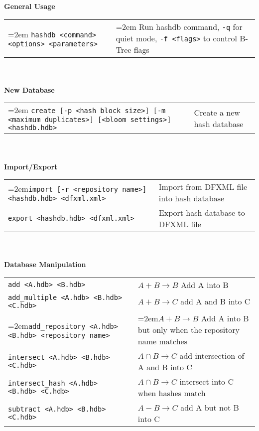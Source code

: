 \begin{small}
\begin{footnotesize}
\textbf{General Usage} \\
\begin{tabular}{p{3.6 in} p{3.0 in}}
\hangindent=2em \texttt{hashdb <command> <options> <parameters>} & \hangindent=2em Run hashdb command, \texttt{-q} for quiet mode, \texttt{-f <flags>} to control B-Tree flags \\
\end{tabular}
\\
\\
\textbf{New Database} \\
\begin{tabular}{p{3.6 in} p{3.0 in}}
\hangindent=2em \texttt{create [-p <hash block size>] [-m <maximum duplicates>] [<bloom settings>] <hashdb.hdb>} &
Create a new hash database \\
\end{tabular}
\\
\\
\textbf{Import/Export} \\
\begin{tabular}{p{3.6 in} p{3.0 in}}
\hangindent=2em\texttt{import [-r <repository name>] <hashdb.hdb> <dfxml.xml>} &
Import from DFXML file into hash database \\
\texttt{export <hashdb.hdb> <dfxml.xml>} &
Export hash database to DFXML file \\
\end{tabular}
\\
\\
\textbf{Database Manipulation} \\
\begin{tabular}{p{3.6 in} p{3.0 in}}
\texttt{add <A.hdb> <B.hdb>} & $A + B \rightarrow B$ Add A into B \\
\texttt{add\_multiple <A.hdb> <B.hdb> <C.hdb>} & $A + B \rightarrow C$ add A and B into C\\
\hangindent=2em\texttt{add\_repository <A.hdb> <B.hdb> <repository name>} & \hangindent=2em$A + B \rightarrow B$ Add A into B but only when the repository name matches \\
\texttt{intersect <A.hdb> <B.hdb> <C.hdb>} & $A \cap B \rightarrow C$ add intersection of A and B into C\\
\texttt{intersect\_hash <A.hdb> <B.hdb> <C.hdb>} & $A \cap B \rightarrow C$ intersect into C when hashes match\\
\texttt{subtract <A.hdb> <B.hdb> <C.hdb>} & $A - B \rightarrow C$ add A but not B into C\\

\end{tabular}
\end{footnotesize}
\end{small}
